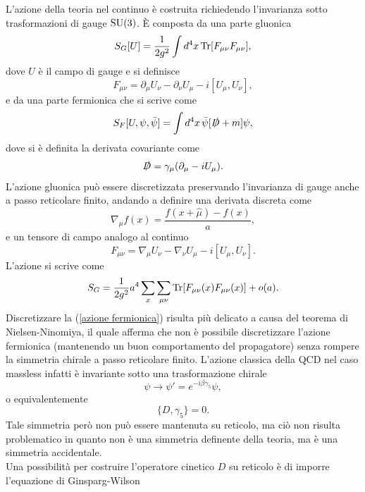 \documentclass{article}
\numberwithin{equation}{subsection}
\begin{document}
L'azione della teoria nel continuo è costruita richiedendo l'invarianza sotto trasformazioni di gauge $\textup{SU}(3)$. È composta da una parte gluonica 
\begin{equation}
    S_G[U]=\frac{1}{2g^2}\int d^4x \, \textup{Tr}[F_{\mu\nu}F_{\mu\nu}],
\end{equation}
dove $U$ è il campo di gauge e si definisce 
\begin{equation}
    F_{\mu\nu}=\partial_\mu U_\nu-\partial_\nu U_\mu-i[U_\mu, U_\nu],
\end{equation}
e da una parte fermionica che si scrive come
\begin{equation}
    \label{azione fermionica}
    S_F[U, \psi, \bar{\psi}]=\int d^4x\, \bar{\psi} [\slashed{D}+m]\psi, 
\end{equation}
dove si è definita la derivata covariante come
\begin{equation}
    \slashed{D}=\gamma_\mu (\partial_\mu-iU_\mu).
\end{equation}
L'azione gluonica può essere discretizzata preservando l'invarianza di gauge anche a passo reticolare finito, andando a definire una derivata discreta come 
\begin{equation}
    \nabla_\mu f(x)=\frac{f(x+\hat{\mu})-f(x)}{a},
\end{equation}
e un tensore di campo analogo al continuo 
\begin{equation}
    F_{\mu\nu}=\nabla_\mu U_\nu-\nabla_\nu U_\mu-i[U_\mu, U_\nu].
\end{equation}
L'azione si scrive come 
\begin{equation}
    S_G=\frac{1}{2g^2}a^4\sum_x \sum_{\mu\nu} \textup{Tr}[F_{\mu\nu}(x)F_{\mu\nu}(x)]+o(a).
\end{equation}
Discretizzare la (\ref{azione fermionica}) risulta più delicato a causa del teorema di Nielsen-Ninomiya, il quale afferma che non è possibile discretizzare l'azione fermionica (mantenendo un buon comportamento del propagatore) senza rompere la simmetria chirale a passo reticolare finito. L'azione classica della QCD nel caso massless infatti è invariante sotto una trasformazione chirale
\begin{equation}
    \label{tras chirale}
    \psi \rightarrow \psi'=e^{-i\beta\gamma_5}\psi, 
\end{equation} 
o equivalentemente 
\begin{equation}
    \{D, \gamma_5\}=0.
\end{equation}
Tale simmetria però non può essere mantenuta su reticolo, ma ciò non risulta problematico in quanto non è una simmetria definente della teoria, ma è una simmetria accidentale.\\ Una possibilità per costruire l'operatore cinetico $D$ su reticolo è di imporre l'equazione di Ginsparg-Wilson
\end{document}
